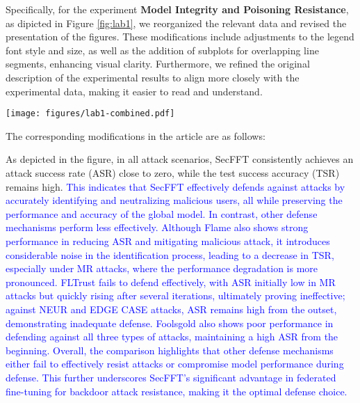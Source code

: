 \documentclass[a4paper,twoside,11pt,dvipsnames]{reviewresponse}
\begin{document}
Specifically, for the experiment \textbf{Model Integrity and Poisoning Resistance}, as dipicted in Figure \ref{fig:lab1}, we reorganized the relevant data and revised the presentation of the figures. These modifications include adjustments to the legend font style and size, as well as the addition of subplots for overlapping line segments, enhancing visual clarity. Furthermore, we refined the original description of the experimental results to align more closely with the experimental data, making it easier to read and understand.

\begin{figure*}[!ht]
    \centering
    \texttt{[image: figures/lab1-combined.pdf]}
    \caption{ASR and TSR of various defense mechanisms (FedAVG, FLTrust, Foolsgold, Flame, SecFFT) under three attacks (MR, NEUR, EDGE CASE).}
    \label{fig:lab1}
\end{figure*}

The corresponding modifications in the article are as follows:

As depicted in the figure, in all attack scenarios, SecFFT consistently achieves an attack success rate (ASR) close to zero, while the test success accuracy (TSR) remains high. \textcolor{blue}{This indicates that SecFFT effectively defends against attacks by accurately identifying and neutralizing malicious users, all while preserving the performance and accuracy of the global model. In contrast, other defense mechanisms perform less effectively. Although Flame also shows strong performance in reducing ASR and mitigating malicious attack, it introduces considerable noise in the identification process, leading to a decrease in TSR, especially under MR attacks, where the performance degradation is more pronounced. FLTrust fails to defend effectively, with ASR initially low in MR attacks but quickly rising after several iterations, ultimately proving ineffective; against NEUR and EDGE CASE attacks, ASR remains high from the outset, demonstrating inadequate defense. Foolsgold also shows poor performance in defending against all three types of attacks, maintaining a high ASR from the beginning. Overall, the comparison highlights that other defense mechanisms either fail to effectively resist attacks or compromise model performance during defense. This further underscores SecFFT's significant advantage in federated fine-tuning for backdoor attack resistance, making it the optimal defense choice.}



\end{document}
